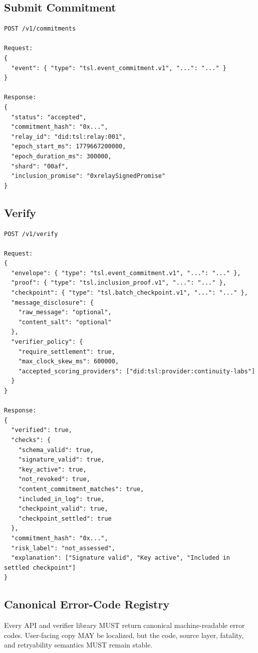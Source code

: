 \documentclass[11pt]{article}
\begin{document}
\subsection{Submit Commitment}

\begin{lstlisting}[style=tslcode]
POST /v1/commitments

Request:
{
  "event": { "type": "tsl.event_commitment.v1", "...": "..." }
}

Response:
{
  "status": "accepted",
  "commitment_hash": "0x...",
  "relay_id": "did:tsl:relay:001",
  "epoch_start_ms": 1779667200000,
  "epoch_duration_ms": 300000,
  "shard": "00af",
  "inclusion_promise": "0xrelaySignedPromise"
}
\end{lstlisting}

\subsection{Verify}

\begin{lstlisting}[style=tslcode]
POST /v1/verify

Request:
{
  "envelope": { "type": "tsl.event_commitment.v1", "...": "..." },
  "proof": { "type": "tsl.inclusion_proof.v1", "...": "..." },
  "checkpoint": { "type": "tsl.batch_checkpoint.v1", "...": "..." },
  "message_disclosure": {
    "raw_message": "optional",
    "content_salt": "optional"
  },
  "verifier_policy": {
    "require_settlement": true,
    "max_clock_skew_ms": 600000,
    "accepted_scoring_providers": ["did:tsl:provider:continuity-labs"]
  }
}

Response:
{
  "verified": true,
  "checks": {
    "schema_valid": true,
    "signature_valid": true,
    "key_active": true,
    "not_revoked": true,
    "content_commitment_matches": true,
    "included_in_log": true,
    "checkpoint_valid": true,
    "checkpoint_settled": true
  },
  "commitment_hash": "0x...",
  "risk_label": "not_assessed",
  "explanation": ["Signature valid", "Key active", "Included in settled checkpoint"]
}
\end{lstlisting}



\subsection{Canonical Error-Code Registry}

Every API and verifier library MUST return canonical machine-readable error codes. User-facing copy MAY be localized, but the code, source layer, fatality, and retryability semantics MUST remain stable.
\end{document}

